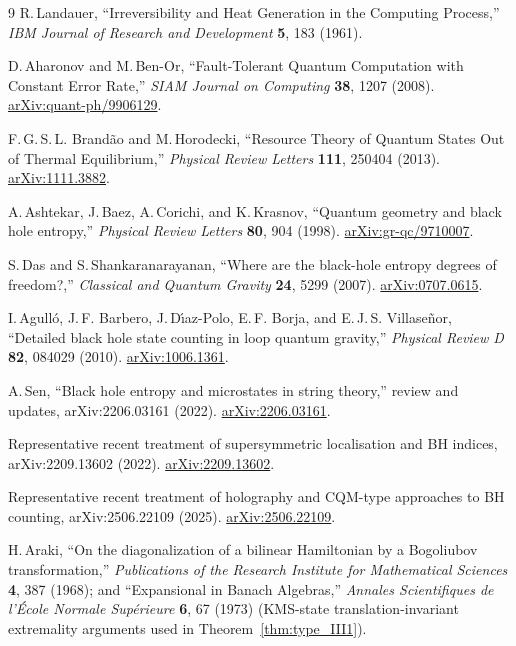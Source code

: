 \documentclass[11pt]{article}
\theoremstyle{plain}
\theoremstyle{definition}
\theoremstyle{remark}
\begin{document}
\begin{thebibliography}{9}
R.\,Landauer,
``Irreversibility and Heat Generation in the Computing Process,''
\textit{IBM Journal of Research and Development} \textbf{5}, 183 (1961).

D.\,Aharonov and M.\,Ben-Or,
``Fault-Tolerant Quantum Computation with Constant Error Rate,''
\textit{SIAM Journal on Computing} \textbf{38}, 1207 (2008).
\href{https://arxiv.org/abs/quant-ph/9906129}{arXiv:quant-ph/9906129}.

F.\,G.\,S.\,L. Brand\~{a}o and M.\,Horodecki,
``Resource Theory of Quantum States Out of Thermal Equilibrium,''
\textit{Physical Review Letters} \textbf{111}, 250404 (2013).
\href{https://arxiv.org/abs/1111.3882}{arXiv:1111.3882}.

A.\,Ashtekar, J.\,Baez, A.\,Corichi, and K.\,Krasnov,
``Quantum geometry and black hole entropy,''
\textit{Physical Review Letters} \textbf{80}, 904 (1998).
\href{https://arxiv.org/abs/gr-qc/9710007}{arXiv:gr-qc/9710007}.

S.\,Das and S.\,Shankaranarayanan,
``Where are the black-hole entropy degrees of freedom?,''
\textit{Classical and Quantum Gravity} \textbf{24}, 5299 (2007).
\href{https://arxiv.org/abs/0707.0615}{arXiv:0707.0615}.

I.\,Agull\'{o}, J.\,F. Barbero, J.\,D\'{\i}az-Polo, E.\,F. Borja, and E.\,J.\,S. Villase\~{n}or,
``Detailed black hole state counting in loop quantum gravity,''
\textit{Physical Review D} \textbf{82}, 084029 (2010).
\href{https://arxiv.org/abs/1006.1361}{arXiv:1006.1361}.

A.\,Sen,
``Black hole entropy and microstates in string theory,'' review and updates,
arXiv:2206.03161 (2022).
\href{https://arxiv.org/abs/2206.03161}{arXiv:2206.03161}.

Representative recent treatment of supersymmetric localisation and BH indices,
arXiv:2209.13602 (2022).
\href{https://arxiv.org/abs/2209.13602}{arXiv:2209.13602}.

Representative recent treatment of holography and CQM-type approaches to BH counting,
arXiv:2506.22109 (2025).
\href{https://arxiv.org/abs/2506.22109}{arXiv:2506.22109}.

H.\,Araki,
``On the diagonalization of a bilinear Hamiltonian by a Bogoliubov transformation,''
\textit{Publications of the Research Institute for Mathematical Sciences} \textbf{4}, 387 (1968);
and ``Expansional in Banach Algebras,''
\textit{Annales Scientifiques de l'École Normale Supérieure} \textbf{6}, 67 (1973) (KMS-state translation-invariant extremality arguments used in Theorem~\ref{thm:type_III1}).


\end{thebibliography}
\end{document}
